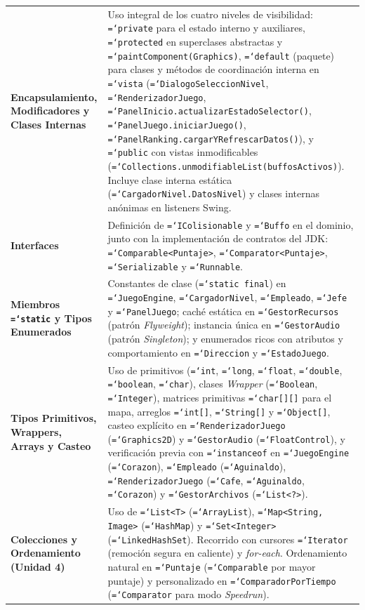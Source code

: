 \documentclass[12pt, a4paper]{article}
\DeclareRobustCommand{\code}[1]{\textcolor{codegreen}{\texttt{\hyphenchar\font=`\-#1}}}
\begin{document}
{\begin{longtable}{@{} >{\raggedright\arraybackslash}p{3.8cm} >{\raggedright\arraybackslash}p{11.4cm} @{}}
\addlinespace[5pt]
\textbf{Encapsulamiento, Modificadores y Clases Internas} & Uso integral de los cuatro niveles de visibilidad: \code{private} para el estado interno y auxiliares, \code{protected} en superclases abstractas y \code{paintComponent(Graphics)}, \code{default} (paquete) para clases y métodos de coordinación interna en \code{vista} (\code{DialogoSeleccionNivel}, \code{RenderizadorJuego}, \code{PanelInicio.actualizarEstadoSelector()}, \code{PanelJuego.iniciarJuego()}, \code{PanelRanking.cargarYRefrescarDatos()}), y \code{public} con vistas inmodificables (\code{Collections.unmodifiableList(buffosActivos)}). Incluye clase interna estática (\code{CargadorNivel.DatosNivel}) y clases internas anónimas en listeners Swing. \\
\addlinespace[5pt]
\textbf{Interfaces} & Definición de \code{IColisionable} y \code{Buffo} en el dominio, junto con la implementación de contratos del JDK: \code{Comparable<Puntaje>}, \code{Comparator<Puntaje>}, \code{Serializable} y \code{Runnable}. \\
\addlinespace[5pt]
\textbf{Miembros \code{static} y Tipos Enumerados} & Constantes de clase (\code{static final}) en \code{JuegoEngine}, \code{CargadorNivel}, \code{Empleado}, \code{Jefe} y \code{PanelJuego}; caché estática en \code{GestorRecursos} (patrón \textit{Flyweight}); instancia única en \code{GestorAudio} (patrón \textit{Singleton}); y enumerados ricos con atributos y comportamiento en \code{Direccion} y \code{EstadoJuego}. \\
\addlinespace[5pt]
\textbf{Tipos Primitivos, Wrappers, Arrays y Casteo} & Uso de primitivos (\code{int}, \code{long}, \code{float}, \code{double}, \code{boolean}, \code{char}), clases \textit{Wrapper} (\code{Boolean}, \code{Integer}), matrices primitivas \code{char[][]} para el mapa, arreglos \code{int[]}, \code{String[]} y \code{Object[]}, casteo explícito en \code{RenderizadorJuego} (\code{Graphics2D}) y \code{GestorAudio} (\code{FloatControl}), y verificación previa con \code{instanceof} en \code{JuegoEngine} (\code{Corazon}), \code{Empleado} (\code{Aguinaldo}), \code{RenderizadorJuego} (\code{Cafe}, \code{Aguinaldo}, \code{Corazon}) y \code{GestorArchivos} (\code{List<?>}). \\
\addlinespace[5pt]
\textbf{Colecciones y Ordenamiento (Unidad 4)} & Uso de \code{List<T>} (\code{ArrayList}), \code{Map<String, Image>} (\code{HashMap}) y \code{Set<Integer>} (\code{LinkedHashSet}). Recorrido con cursores \code{Iterator} (remoción segura en caliente) y \textit{for-each}. Ordenamiento natural en \code{Puntaje} (\code{Comparable} por mayor puntaje) y personalizado en \code{ComparadorPorTiempo} (\code{Comparator} para modo \textit{Speedrun}). \\

\end{longtable}}
\end{document}
